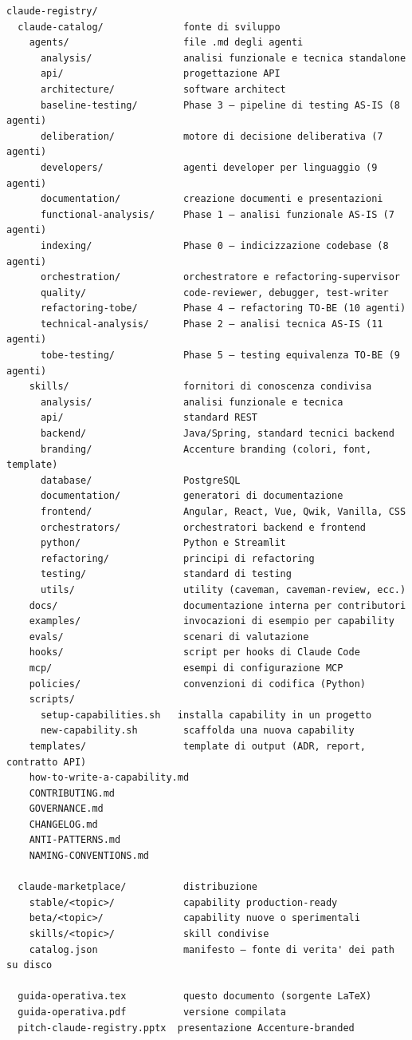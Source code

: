 \documentclass[12pt,a4paper,twoside]{book}
\begin{document}
\begin{lstlisting}
claude-registry/
  claude-catalog/              fonte di sviluppo
    agents/                    file .md degli agenti
      analysis/                analisi funzionale e tecnica standalone
      api/                     progettazione API
      architecture/            software architect
      baseline-testing/        Phase 3 — pipeline di testing AS-IS (8 agenti)
      deliberation/            motore di decisione deliberativa (7 agenti)
      developers/              agenti developer per linguaggio (9 agenti)
      documentation/           creazione documenti e presentazioni
      functional-analysis/     Phase 1 — analisi funzionale AS-IS (7 agenti)
      indexing/                Phase 0 — indicizzazione codebase (8 agenti)
      orchestration/           orchestratore e refactoring-supervisor
      quality/                 code-reviewer, debugger, test-writer
      refactoring-tobe/        Phase 4 — refactoring TO-BE (10 agenti)
      technical-analysis/      Phase 2 — analisi tecnica AS-IS (11 agenti)
      tobe-testing/            Phase 5 — testing equivalenza TO-BE (9 agenti)
    skills/                    fornitori di conoscenza condivisa
      analysis/                analisi funzionale e tecnica
      api/                     standard REST
      backend/                 Java/Spring, standard tecnici backend
      branding/                Accenture branding (colori, font, template)
      database/                PostgreSQL
      documentation/           generatori di documentazione
      frontend/                Angular, React, Vue, Qwik, Vanilla, CSS
      orchestrators/           orchestratori backend e frontend
      python/                  Python e Streamlit
      refactoring/             principi di refactoring
      testing/                 standard di testing
      utils/                   utility (caveman, caveman-review, ecc.)
    docs/                      documentazione interna per contributori
    examples/                  invocazioni di esempio per capability
    evals/                     scenari di valutazione
    hooks/                     script per hooks di Claude Code
    mcp/                       esempi di configurazione MCP
    policies/                  convenzioni di codifica (Python)
    scripts/
      setup-capabilities.sh   installa capability in un progetto
      new-capability.sh        scaffolda una nuova capability
    templates/                 template di output (ADR, report, contratto API)
    how-to-write-a-capability.md
    CONTRIBUTING.md
    GOVERNANCE.md
    CHANGELOG.md
    ANTI-PATTERNS.md
    NAMING-CONVENTIONS.md

  claude-marketplace/          distribuzione
    stable/<topic>/            capability production-ready
    beta/<topic>/              capability nuove o sperimentali
    skills/<topic>/            skill condivise
    catalog.json               manifesto — fonte di verita' dei path su disco

  guida-operativa.tex          questo documento (sorgente LaTeX)
  guida-operativa.pdf          versione compilata
  pitch-claude-registry.pptx  presentazione Accenture-branded
\end{lstlisting}
\end{document}
